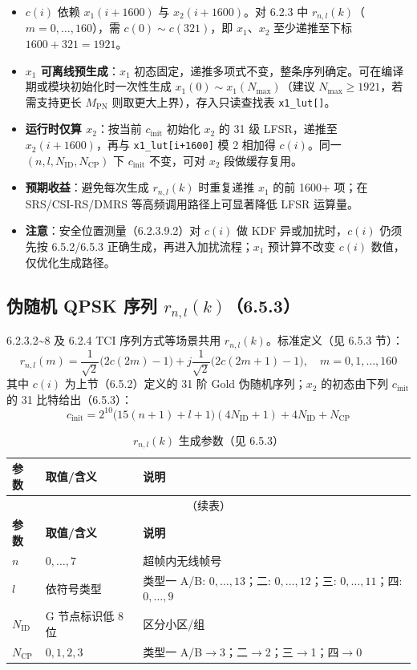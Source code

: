 \documentclass[11pt,a4paper]{ctexart}
\begin{document}
\begin{itemize}[nosep]
  \item $c(i)$ 依赖 $x_1(i+1600)$ 与 $x_2(i+1600)$。对 6.2.3 中 $r_{n,l}(k)$（$m=0,\ldots,160$），需 $c(0)\sim c(321)$，即 $x_1$、$x_2$ 至少递推至下标 $1600+321=1921$。
  \item \textbf{$x_1$ 可离线预生成}：$x_1$ 初态固定，递推多项式不变，整条序列确定。可在编译期或模块初始化时一次性生成 $x_1(0)\sim x_1(N_{\max})$（建议 $N_{\max}\geq 1921$，若需支持更长 $M_{\mathrm{PN}}$ 则取更大上界），存入只读查找表 \texttt{x1\_lut[]}。
  \item \textbf{运行时仅算 $x_2$}：按当前 $c_{\mathrm{init}}$ 初始化 $x_2$ 的 31 级 LFSR，递推至 $x_2(i+1600)$，再与 \texttt{x1\_lut[i+1600]} 模 2 相加得 $c(i)$。同一 $(n,l,N_{\mathrm{ID}},N_{\mathrm{CP}})$ 下 $c_{\mathrm{init}}$ 不变，可对 $x_2$ 段做缓存复用。
  \item \textbf{预期收益}：避免每次生成 $r_{n,l}(k)$ 时重复递推 $x_1$ 的前 1600+ 项；在 SRS/CSI-RS/DMRS 等高频调用路径上可显著降低 LFSR 运算量。
  \item \textbf{注意}：安全位置测量（6.2.3.9.2）对 $c(i)$ 做 KDF 异或加扰时，$c(i)$ 仍须先按 6.5.2/6.5.3 正确生成，再进入加扰流程；$x_1$ 预计算不改变 $c(i)$ 数值，仅优化生成路径。
\end{itemize}

\subsection{伪随机 QPSK 序列 $r_{n,l}(k)$（6.5.3）}

6.2.3.2\textasciitilde 8 及 6.2.4 TCI 序列方式等场景共用 $r_{n,l}(k)$。标准定义（见 6.5.3 节）：
\begin{equation}
r_{n,l}(m) = \frac{1}{\sqrt{2}}\bigl(2c(2m)-1\bigr) + j\frac{1}{\sqrt{2}}\bigl(2c(2m{+}1)-1\bigr), \quad m=0,1,\ldots,160
\end{equation}
其中 $c(i)$ 为上节（6.5.2）定义的 31 阶 Gold 伪随机序列；$x_2$ 的初态由下列 $c_{\mathrm{init}}$ 的 31 比特给出（6.5.3）：
\begin{equation}
c_{\mathrm{init}} = 2^{10}\bigl(15(n{+}1)+l{+}1\bigr)(4N_{\mathrm{ID}}{+}1) + 4N_{\mathrm{ID}} + N_{\mathrm{CP}}
\end{equation}
\begin{longtable}{lll}
\caption{$r_{n,l}(k)$ 生成参数（见 6.5.3）} \\
\toprule
\textbf{参数} & \textbf{取值/含义} & \textbf{说明} \\
\midrule
\endfirsthead
\multicolumn{3}{c}{\small（续表）} \\
\toprule
\textbf{参数} & \textbf{取值/含义} & \textbf{说明} \\
\midrule
\endhead
\bottomrule
\endfoot
$n$ & $0,\ldots,7$ & 超帧内无线帧号 \\
$l$ & 依符号类型 & 类型一 A/B: $0,\ldots,13$；二: $0,\ldots,12$；三: $0,\ldots,11$；四: $0,\ldots,9$ \\
$N_{\mathrm{ID}}$ & G 节点标识低 8 位 & 区分小区/组 \\
$N_{\mathrm{CP}}$ & $0,1,2,3$ & 类型一 A/B$\rightarrow$3；二$\rightarrow$2；三$\rightarrow$1；四$\rightarrow$0 \\
\end{longtable}
\end{document}
